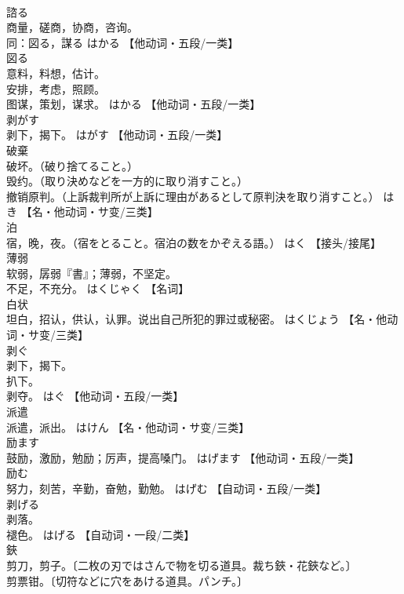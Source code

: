 \documentclass[8pt]{extreport}
\begin{document}
\begin{CJK}{UTF8}{min}
\\	諮る	
\\	商量，磋商，协商，咨询。 
\\	同：図る，謀る	はかる		【他动词・五段/一类】
\\	図る	
\\	意料，料想，估计。 
\\	安排，考虑，照顾。 
\\	图谋，策划，谋求。	はかる		【他动词・五段/一类】
\\	剥がす	
\\	剥下，揭下。	はがす		【他动词・五段/一类】
\\	破棄	
\\	破坏。（破り捨てること。） 
\\	毁约。（取り決めなどを一方的に取り消すこと。） 
\\	撤销原判。（上訴裁判所が上訴に理由があるとして原判決を取り消すこと。）	はき		【名・他动词・サ变/三类】
\\	泊	
\\	宿，晚，夜。（宿をとること。宿泊の数をかぞえる語。）	はく		【接头/接尾】
\\	薄弱	
\\	软弱，孱弱『書』；薄弱，不坚定。 
\\	不足，不充分。	はくじゃく		【名词】
\\	白状	
\\	坦白，招认，供认，认罪。说出自己所犯的罪过或秘密。	はくじょう		【名・他动词・サ变/三类】
\\	剥ぐ	
\\	剥下，揭下。 
\\	扒下。 
\\	剥夺。	はぐ		【他动词・五段/一类】
\\	派遣	
\\	派遣，派出。	はけん		【名・他动词・サ变/三类】
\\	励ます	
\\	鼓励，激励，勉励；厉声，提高嗓门。	はげます		【他动词・五段/一类】
\\	励む	
\\	努力，刻苦，辛勤，奋勉，勤勉。	はげむ		【自动词・五段/一类】
\\	剥げる	
\\	剥落。 
\\	褪色。	はげる		【自动词・一段/二类】
\\	鋏	
\\	剪刀，剪子。〔二枚の刃ではさんで物を切る道具。裁ち鋏・花鋏など。〕 
\\	剪票钳。〔切符などに穴をあける道具。パンチ。〕 

\end{CJK}
\end{document}
